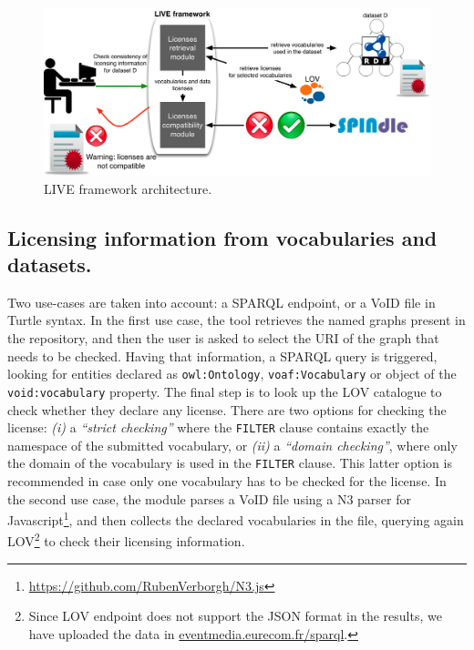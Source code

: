 \begin{figure}
\centering
\includegraphics[width=12.0cm]{img/live-framework.pdf}
\caption{LIVE framework architecture.}
\label{fig:framework}
\end{figure}


\subsection{Licensing information from vocabularies and datasets.}
Two use-cases are taken into account: a SPARQL endpoint, or a VoID file in Turtle syntax. 
In the first use case, the tool retrieves the named graphs present in the repository, and then the user is asked to select the URI of the graph that needs to be checked. Having that information, a SPARQL query is triggered, looking for entities declared as \texttt{owl:Ontology}, \texttt{voaf:Vocabulary} or object  of the \texttt{void:vocabulary} property. The final step is to look up the LOV catalogue to check whether they declare any license. There are two options for checking the license: \textit{(i)} a \textit{``strict checking'' } where the \texttt{FILTER} clause contains exactly the namespace of the submitted vocabulary, or \textit{(ii)} a \textit{``domain checking''}, where only the domain of the vocabulary is used in the \texttt{FILTER} clause. This latter option is recommended in case only one vocabulary has to be checked for the license. 
%
In the second use case, the module parses a VoID file using a N3 parser for Javascript\footnote{\url{https://github.com/RubenVerborgh/N3.js}}, and then collects the declared vocabularies in the file, querying again LOV\footnote{Since LOV endpoint does not support the JSON format in the results, we have uploaded the data in \url{eventmedia.eurecom.fr/sparql}.} to check their licensing information. 
%
